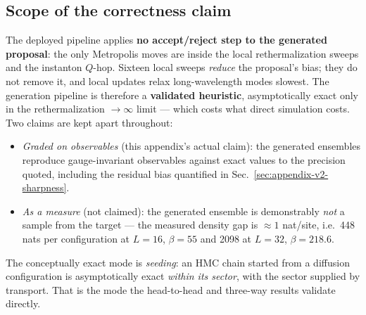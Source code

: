 
\subsection{Scope of the correctness claim}
\label{sec:appendix-v2-scope}

The deployed pipeline applies \textbf{no accept/reject step to the generated
proposal}: the only Metropolis moves are inside the local rethermalization
sweeps and the instanton $Q$-hop. Sixteen local sweeps \emph{reduce} the
proposal's bias; they do not remove it, and local updates relax
long-wavelength modes slowest. The generation pipeline is therefore a
\textbf{validated heuristic}, asymptotically exact only in the
rethermalization $\to \infty$ limit --- which costs what direct simulation
costs. Two claims are kept apart throughout:

\begin{itemize}
  \item \emph{Graded on observables} (this appendix's actual claim): the
    generated ensembles reproduce gauge-invariant observables against exact
    values to the precision quoted, including the residual bias quantified
    in Sec.~\ref{sec:appendix-v2-sharpness}.
  \item \emph{As a measure} (not claimed): the generated ensemble is
    demonstrably \emph{not} a sample from the target --- the measured density
    gap is ${\approx}1$ nat/site, i.e.\ 448 nats per configuration at
    $L = 16$, $\beta = 55$ and 2098 at $L = 32$, $\beta = 218.6$.
\end{itemize}

The conceptually exact mode is \emph{seeding}: an HMC chain started from a
diffusion configuration is asymptotically exact \emph{within its sector},
with the sector supplied by transport. That is the mode the head-to-head and
three-way results validate directly.

